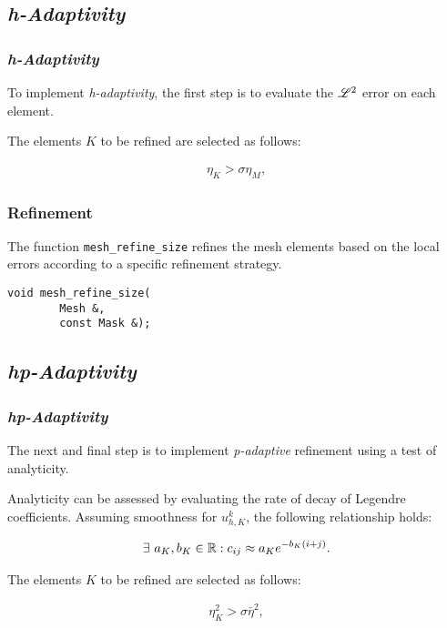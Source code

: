 \subsection{\textit{h-Adaptivity}}

\begin{frame}[fragile]
    \frametitle{\textit{h-Adaptivity}}

    To implement \textit{h-adaptivity}, the first step is to evaluate the $\mathscr{L}^2$ error on each element.

    The elements $K$ to be refined are selected as follows:

    \begin{gather}
        \eta_K > \sigma \eta_{M},
    \end{gather}

\end{frame}

\begin{frame}[fragile]
    \frametitle{Refinement}

    The function \lstinline{mesh_refine_size} refines the mesh elements based on the local errors according to a specific refinement strategy.

    \begin{lstlisting}[style=cpp]
    void mesh_refine_size(
        Mesh &, 
        const Mask &);
    \end{lstlisting}

\end{frame}

\subsection{\textit{hp-Adaptivity}}

\begin{frame}
    \frametitle{\textit{hp-Adaptivity}}

    The next and final step is to implement \textit{p-adaptive} refinement using a test of analyticity.

    Analyticity can be assessed by evaluating the rate of decay of Legendre coefficients. Assuming smoothness for $u^k_{h, K}$, the following relationship holds:

    \begin{gather}
        \exists ~ a_K, b_K \in \mathbb{R} : c_{ij} \approx a_K e^{-b_K (i + j)}.
    \end{gather}

    The elements $K$ to be refined are selected as follows:

    \begin{gather}
        \eta_K^2 > \sigma \bar{\eta}^2,
    \end{gather}

\end{frame}

